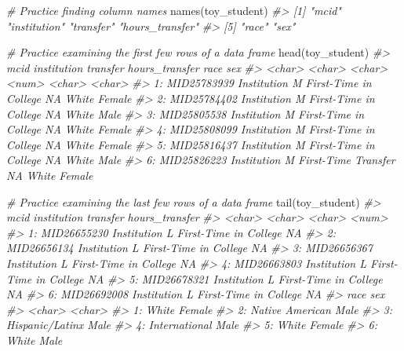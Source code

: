 \documentclass[
]{book}
\newenvironment{Shaded}{\begin{snugshade}}{\end{snugshade}}
\newcommand{\CommentTok}[1]{\textcolor[rgb]{0.56,0.35,0.01}{\textit{#1}}}
\newcommand{\FunctionTok}[1]{\textcolor[rgb]{0.00,0.00,0.00}{#1}}
\newcommand{\NormalTok}[1]{#1}
\begin{document}
\begin{Shaded}
\begin{Highlighting}[]
\CommentTok{\# Practice finding column names}
\FunctionTok{names}\NormalTok{(toy\_student)}
\CommentTok{\#\textgreater{} [1] "mcid"           "institution"    "transfer"       "hours\_transfer"}
\CommentTok{\#\textgreater{} [5] "race"           "sex"}

\CommentTok{\# Practice examining the first few rows of a data frame}
\FunctionTok{head}\NormalTok{(toy\_student)}
\CommentTok{\#\textgreater{}           mcid   institution              transfer hours\_transfer   race    sex}
\CommentTok{\#\textgreater{}         \textless{}char\textgreater{}        \textless{}char\textgreater{}                \textless{}char\textgreater{}          \textless{}num\textgreater{} \textless{}char\textgreater{} \textless{}char\textgreater{}}
\CommentTok{\#\textgreater{} 1: MID25783939 Institution M First{-}Time in College             NA  White Female}
\CommentTok{\#\textgreater{} 2: MID25784402 Institution M First{-}Time in College             NA  White   Male}
\CommentTok{\#\textgreater{} 3: MID25805538 Institution M First{-}Time in College             NA  White Female}
\CommentTok{\#\textgreater{} 4: MID25808099 Institution M First{-}Time in College             NA  White Female}
\CommentTok{\#\textgreater{} 5: MID25816437 Institution M First{-}Time in College             NA  White   Male}
\CommentTok{\#\textgreater{} 6: MID25826223 Institution M   First{-}Time Transfer             NA  White Female}

\CommentTok{\# Practice examining the last few rows of a data frame}
\FunctionTok{tail}\NormalTok{(toy\_student)}
\CommentTok{\#\textgreater{}           mcid   institution              transfer hours\_transfer}
\CommentTok{\#\textgreater{}         \textless{}char\textgreater{}        \textless{}char\textgreater{}                \textless{}char\textgreater{}          \textless{}num\textgreater{}}
\CommentTok{\#\textgreater{} 1: MID26655230 Institution L First{-}Time in College             NA}
\CommentTok{\#\textgreater{} 2: MID26656134 Institution L First{-}Time in College             NA}
\CommentTok{\#\textgreater{} 3: MID26656367 Institution L First{-}Time in College             NA}
\CommentTok{\#\textgreater{} 4: MID26663803 Institution L First{-}Time in College             NA}
\CommentTok{\#\textgreater{} 5: MID26678321 Institution L First{-}Time in College             NA}
\CommentTok{\#\textgreater{} 6: MID26692008 Institution L First{-}Time in College             NA}
\CommentTok{\#\textgreater{}               race    sex}
\CommentTok{\#\textgreater{}             \textless{}char\textgreater{} \textless{}char\textgreater{}}
\CommentTok{\#\textgreater{} 1:           White Female}
\CommentTok{\#\textgreater{} 2: Native American   Male}
\CommentTok{\#\textgreater{} 3: Hispanic/Latinx   Male}
\CommentTok{\#\textgreater{} 4:   International   Male}
\CommentTok{\#\textgreater{} 5:           White Female}
\CommentTok{\#\textgreater{} 6:           White   Male}
\end{Highlighting}
\end{Shaded}
\end{document}
